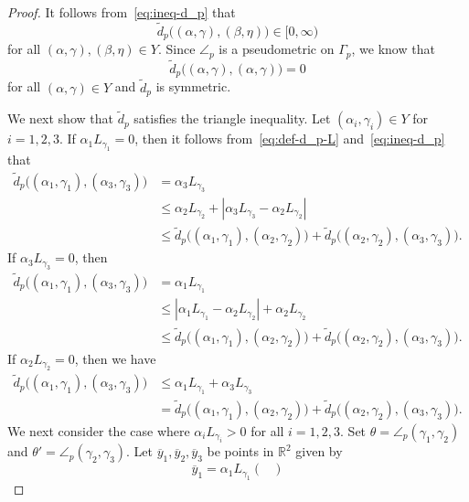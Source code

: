 \documentclass[draft]{amsart}
\numberwithin{equation}{section}
\def\R{\mathbb R}
\providecommand{\abs}[1]{\left\lvert#1\right\rvert}
\theoremstyle{plain}
\theoremstyle{definition}
\theoremstyle{remark}
\begin{document}
\begin{proof}
 It follows from~\eqref{eq:ineq-d_p} that 
 \[
  \tilde{d}_p\bigl((\alpha, \gamma), (\beta, \eta)\bigr)\in [0,\infty)
 \]
 for all $(\alpha, \gamma), (\beta, \eta)\in Y$. 
 Since $\angle_p$ is a pseudometric on $\Gamma_p$, 
 we know that 
 \[
  \tilde{d}_p\bigl((\alpha, \gamma), (\alpha, \gamma)\bigr) =0
 \]
 for all $(\alpha, \gamma)\in Y$ and 
 $\tilde{d}_p$ is symmetric. 
 
 We next show that $\tilde{d}_p$ satisfies the triangle 
 inequality. Let $(\alpha_i, \gamma_i) \in Y$ 
 for $i=1,2,3$. 
 If $\alpha_1 L_{\gamma_1}=0$, 
 then it follows from~\eqref{eq:def-d_p-L} and~\eqref{eq:ineq-d_p} that 
 \begin{align*}
  \tilde{d}_p\bigl((\alpha_1, \gamma_1), (\alpha_3, \gamma_3)\bigr) 
  &=\alpha_3 L_{\gamma_3} \\
  &\leq \alpha_2 L_{\gamma_2} + \abs{\alpha_3 L_{\gamma_3} - \alpha_2 L_{\gamma_2}} \\
  &\leq 
   \tilde{d}_p\bigl((\alpha_1, \gamma_1), (\alpha_2, \gamma_2)\bigr) 
  +
  \tilde{d}_p\bigl((\alpha_2, \gamma_2), (\alpha_3, \gamma_3)\bigr). 
 \end{align*}
 If $\alpha_3 L_{\gamma_3}=0$, then 
 \begin{align*}
  \tilde{d}_p\bigl((\alpha_1, \gamma_1), (\alpha_3, \gamma_3)\bigr) 
  &=\alpha_1 L_{\gamma_1} \\
  &\leq \abs{\alpha_1 L_{\gamma_1} - \alpha_2 L_{\gamma_2}} + \alpha_2 L_{\gamma_2} \\
  &\leq 
   \tilde{d}_p\bigl((\alpha_1, \gamma_1), (\alpha_2, \gamma_2)\bigr) 
  +
  \tilde{d}_p\bigl((\alpha_2, \gamma_2), (\alpha_3, \gamma_3)\bigr). 
 \end{align*}
 If $\alpha_2 L_{\gamma_2} =0$, then we have 
 \begin{align*}
  \tilde{d}_p\bigl((\alpha_1, \gamma_1), (\alpha_3, \gamma_3)\bigr) 
  &\leq \alpha_1 L_{\gamma_1} + \alpha_3 L_{\gamma_3} \\
  &=
   \tilde{d}_p\bigl((\alpha_1, \gamma_1), (\alpha_2, \gamma_2)\bigr) 
  +
  \tilde{d}_p\bigl((\alpha_2, \gamma_2), (\alpha_3, \gamma_3)\bigr). 
 \end{align*}
 We next consider the case where $\alpha_i L_{\gamma_i} >0$ 
 for all $i=1,2,3$. Set $\theta=\angle_p(\gamma_1, \gamma_2)$ 
 and $\theta'=\angle_p(\gamma_2, \gamma_3)$. 
 Let $\overline{y}_1, \overline{y}_2, \overline{y}_3$ 
 be points in $\R^2$ given by 
 \[
  \overline{y}_1 = 
   \alpha_1 L_{\gamma_1}
  \begin{pmatrix}

\end{pmatrix}\]
\end{proof}
\end{document}
